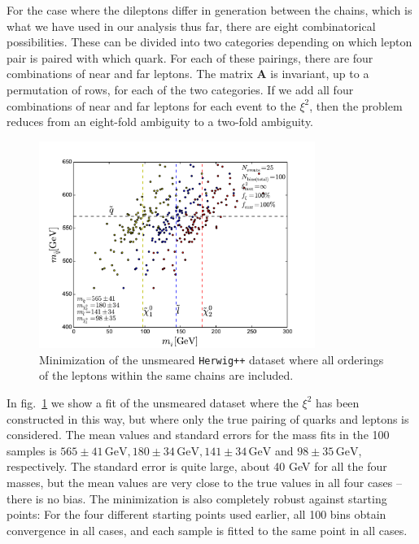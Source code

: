 \documentclass[twoside,english]{uiofysmaster}
\begin{document}
For the case where the dileptons differ in generation between the chains, which is what we have used in our analysis thus far, there are eight combinatorical possibilities. These can be divided into two categories depending on which lepton pair is paired with which quark. For each of these pairings, there are four combinations of near and far leptons. The matrix $\mathbf{A}$ is invariant, up to a permutation of rows, for each of the two categories. If we add all four combinations of near and far leptons for each event to the $\xi^2$, then the problem reduces from an eight-fold ambiguity to a two-fold ambiguity. 
\begin{figure}[hbt]
	\centering
	\includegraphics[width=0.8\textwidth]{figures/improving_combinatorics/herwigpp-4combosum-fit-nocomb-nosmear-nocut.pdf} 
	\caption{Minimization of the unsmeared {\tt Herwig++} dataset where all orderings of the leptons within the same chains are included.}
	\label{fig:4combosum_nocomb-nosmear}
\end{figure}
In fig.\ \ref{fig:4combosum_nocomb-nosmear} we show a fit of the unsmeared dataset where the $\xi^2$ has been constructed in this way, but where only the true pairing of quarks and leptons is considered. The mean values and standard errors for the mass fits in the 100 samples is $565 \pm 41\, \mathrm{GeV}, 180 \pm 34\, \mathrm{GeV}, 141 \pm 34\, \mathrm{GeV}$ and $98 \pm 35\, \mathrm{GeV}$, respectively. The standard error is quite large, about 40 GeV for all the four masses, but the mean values are very close to the true values in all four cases -- there is no bias. The minimization is also completely robust against starting points: For the four different starting points used earlier, all 100 bins obtain convergence in all cases, and each sample is fitted to the same point in all cases. 
\end{document}

